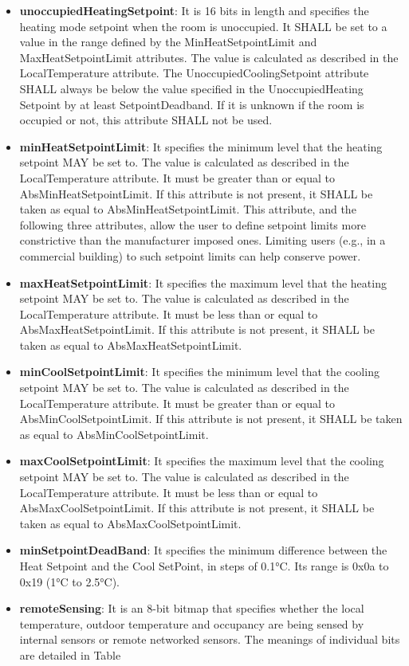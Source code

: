 \begin{itemize}
\item \textbf{unoccupiedHeatingSetpoint}: It is 16 bits in length and specifies the heating mode setpoint when the room is unoccupied. It SHALL be set to a value in the range defined by the MinHeatSetpointLimit and MaxHeatSetpointLimit attributes. The value is calculated as described in the LocalTemperature attribute. The UnoccupiedCoolingSetpoint attribute SHALL always be below the value specified in the UnoccupiedHeating Setpoint by at least SetpointDeadband. If it is unknown if the room is occupied or not, this attribute SHALL not be used.
\item \textbf{minHeatSetpointLimit}: It specifies the minimum level that the heating setpoint MAY be set to. The value is calculated as described in the LocalTemperature attribute. It must be greater than or equal to AbsMinHeatSetpointLimit. If this attribute is not present, it SHALL be taken as equal to AbsMinHeatSetpointLimit. This attribute, and the following three attributes, allow the user to define setpoint limits more constrictive than the manufacturer imposed ones. Limiting users (e.g., in a commercial building) to such setpoint limits can help conserve power.
\item \textbf{maxHeatSetpointLimit}: It specifies the maximum level that the heating setpoint MAY be set to. The value is calculated as described in the LocalTemperature attribute. It must be less than or equal to AbsMaxHeatSetpointLimit. If this attribute is not present, it SHALL be taken as equal to AbsMaxHeatSetpointLimit.
\item \textbf{minCoolSetpointLimit}: It specifies the minimum level that the cooling setpoint MAY be set to. The value is calculated as described in the LocalTemperature attribute. It must be greater than or equal to AbsMinCoolSetpointLimit. If this attribute is not present, it SHALL be taken as equal to AbsMinCoolSetpointLimit.
\item \textbf{maxCoolSetpointLimit}: It specifies the maximum level that the cooling setpoint MAY be set to. The value is calculated as described in the LocalTemperature attribute. It must be less than or equal to AbsMaxCoolSetpointLimit. If this attribute is not present, it SHALL be taken as equal to AbsMaxCoolSetpointLimit.
\item \textbf{minSetpointDeadBand}: It specifies the minimum difference between the Heat Setpoint and the Cool SetPoint, in steps of 0.1°C. Its range is 0x0a to 0x19 (1°C to 2.5°C).
\item \textbf{remoteSensing}: It is an 8-bit bitmap that specifies whether the local temperature, outdoor temperature and occupancy are being sensed by internal sensors or remote networked sensors. The meanings of individual bits are detailed in Table

\end{itemize}
